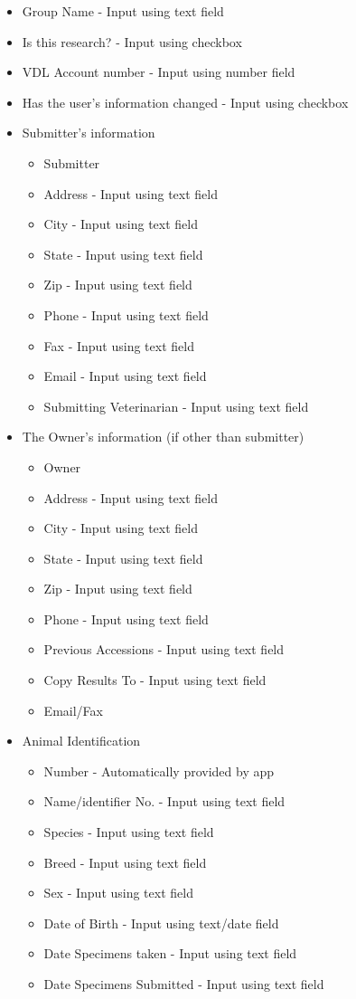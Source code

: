\documentclass[onecolumn, draftclsnofoot,10pt, compsoc]{IEEEtran}
\begin{document}
\begin{itemize}
\item Group Name - Input using text field
\item Is this research? - Input using checkbox
\item VDL Account number - Input using number field
\item Has the user's information changed - Input using checkbox
\item Submitter's information

\begin{itemize}
\item Submitter
\item Address - Input using text field
\item City - Input using text field
\item State - Input using text field
\item Zip - Input using text field
\item Phone - Input using text field
\item Fax - Input using text field
\item Email - Input using text field
\item Submitting Veterinarian - Input using text field
\end{itemize}


\item The Owner's information (if other than submitter)
\begin{itemize}
\item Owner
\item Address - Input using text field
\item City - Input using text field
\item State - Input using text field
\item Zip - Input using text field
\item Phone - Input using text field
\item Previous Accessions - Input using text field
\item Copy Results To - Input using text field
\item Email/Fax
\end{itemize}


\item Animal Identification
    \begin{itemize}
    \item Number - Automatically provided by app
    \item Name/identifier No. - Input using text field
    \item Species - Input using text field
    \item Breed - Input using text field
    \item Sex - Input using text field
    \item Date of Birth - Input using text/date field
	\item Date Specimens taken - Input using text field
    \item Date Specimens Submitted - Input using text field


\end{itemize}
\end{itemize}
\end{document}
